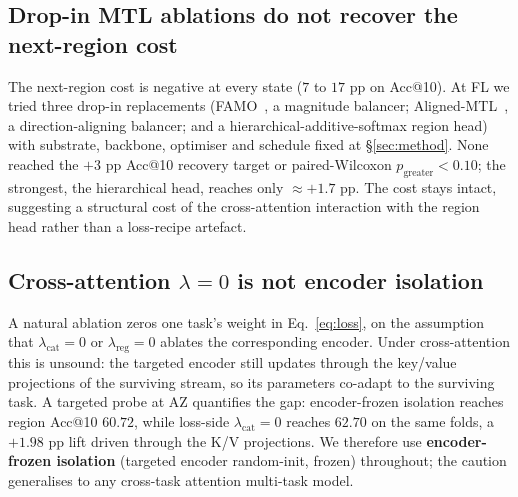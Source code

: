 \subsection{Drop-in MTL ablations do not recover the next-region cost}
\label{subsec:mechanism-ablations}

The next-region cost is negative at every state ($7$ to $17$ pp on Acc@10). At FL we tried three drop-in replacements (FAMO~\cite{liu2023famo}, a magnitude balancer; Aligned-MTL~\cite{senushkin2023aligned}, a direction-aligning balancer; and a hierarchical-additive-softmax region head) with substrate, backbone, optimiser and schedule fixed at \S\ref{sec:method}. None reached the $+3$ pp Acc@10 recovery target or paired-Wilcoxon $p_{\text{greater}}<0.10$; the strongest, the hierarchical head, reaches only ${\approx}+1.7$ pp. The cost stays intact, suggesting a structural cost of the cross-attention interaction with the region head rather than a loss-recipe artefact.

\subsection{Cross-attention $\lambda = 0$ is not encoder isolation}
\label{subsec:mechanism-isolation}

A natural ablation zeros one task's weight in Eq.~\eqref{eq:loss}, on the assumption that $\lambda_{\text{cat}}=0$ or $\lambda_{\text{reg}}=0$ ablates the corresponding encoder. Under cross-attention this is unsound: the targeted encoder still updates through the key/value projections of the surviving stream, so its parameters co-adapt to the surviving task. A targeted probe at AZ quantifies the gap: encoder-frozen isolation reaches region Acc@10 $60.72$, while loss-side $\lambda_{\text{cat}}=0$ reaches $62.70$ on the same folds, a $+1.98$ pp lift driven through the K/V projections. We therefore use \textbf{encoder-frozen isolation} (targeted encoder random-init, frozen) throughout; the caution generalises to any cross-task attention multi-task model.
